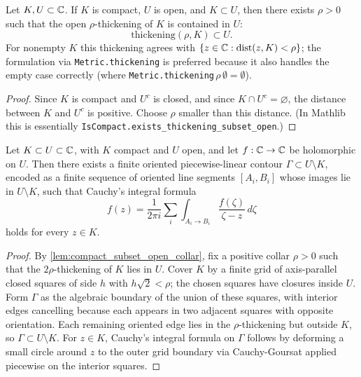 \begin{lemma}
    \label{lem:compact_subset_open_collar}
    \leanok
    Let \(K,U \subset \mathbb{C}\). If \(K\) is compact, \(U\) is open, and \(K \subset U\),
    then there exists \(\rho > 0\) such that the open \(\rho\)-thickening of
    \(K\) is contained in \(U\):
    \[
      \mathrm{thickening}(\rho, K) \subset U .
    \]
    For nonempty \(K\) this thickening agrees with
    \(\{z \in \mathbb{C} : \operatorname{dist}(z,K) < \rho\}\); the formulation via
    \texttt{Metric.thickening} is preferred because it also handles the empty
    case correctly (where \texttt{Metric.thickening}\(\,\rho\,\emptyset = \emptyset\)).
\end{lemma}

\begin{proof}
    Since \(K\) is compact and \(U^c\) is closed, and since \(K \cap U^c=\varnothing\),
    the distance between \(K\) and \(U^c\) is positive. Choose \(\rho\) smaller than
    this distance. (In Mathlib this is essentially
    \texttt{IsCompact.exists\_thickening\_subset\_open}.)
\end{proof}

\begin{lemma}
    \label{lem:cauchy_grid_representation}
    Let \(K \subset U \subset \mathbb{C}\), with \(K\) compact and \(U\) open, and let
    \(f : \mathbb{C} \to \mathbb{C}\) be holomorphic on \(U\). Then there exists a finite oriented
    piecewise-linear contour \(\Gamma \subset U \setminus K\), encoded as a finite
    sequence of oriented line segments \([A_i, B_i]\) whose images lie in
    \(U \setminus K\), such that Cauchy's integral formula
    \[
      f(z) = \frac{1}{2\pi i}\sum_{i} \int_{A_i \to B_i}
        \frac{f(\zeta)}{\zeta-z}\,d\zeta
    \]
    holds for every \(z \in K\).
\end{lemma}

\begin{proof}
    By \cref{lem:compact_subset_open_collar}, fix a positive collar \(\rho>0\)
    such that the \(2\rho\)-thickening of \(K\) lies in \(U\). Cover \(K\) by a
    finite grid of axis-parallel closed squares of side \(h\) with
    \(h\sqrt 2 < \rho\); the chosen squares have closures inside \(U\). Form
    \(\Gamma\) as the algebraic boundary of the union of these squares, with
    interior edges cancelling because each appears in two adjacent squares with
    opposite orientation. Each remaining oriented edge lies in the
    \(\rho\)-thickening but outside \(K\), so \(\Gamma \subset U \setminus K\).
    For \(z \in K\), Cauchy's integral formula on \(\Gamma\) follows by
    deforming a small circle around \(z\) to the outer grid boundary via
    Cauchy-Goursat applied piecewise on the interior squares.
\end{proof}

